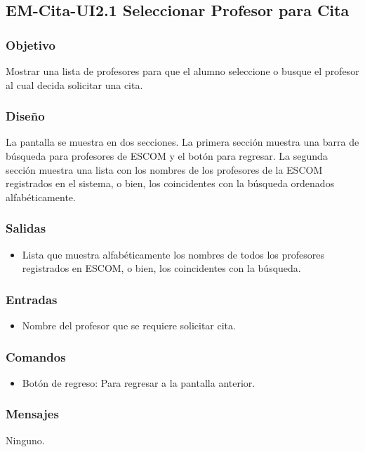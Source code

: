 \pagebreak

\subsection{EM-Cita-UI2.1 Seleccionar Profesor para Cita }

\subsubsection{Objetivo}
	\noindent
	Mostrar una lista de profesores para que el alumno seleccione o busque el profesor al cual decida solicitar una cita.

\subsubsection{Diseño}
	\noindent
	La pantalla se muestra en dos secciones. La primera sección muestra una barra de búsqueda para profesores de ESCOM y el botón para regresar. La segunda sección muestra una lista con los nombres de los profesores de la ESCOM registrados en el sistema, o bien, los coincidentes con la búsqueda ordenados alfabéticamente. 


\subsubsection{Salidas}
	\begin{itemize}
		\item Lista que muestra alfabéticamente los nombres de todos los profesores registrados en ESCOM, o bien, los coincidentes con la búsqueda. 
	\end{itemize}

\subsubsection{Entradas}

\begin{itemize}
		\item Nombre del profesor que se requiere solicitar cita.  
	\end{itemize}

\subsubsection{Comandos}
\begin{itemize}
		\item Botón de regreso: Para regresar a la pantalla anterior. 
	\end{itemize}

\subsubsection{Mensajes}
Ninguno.

